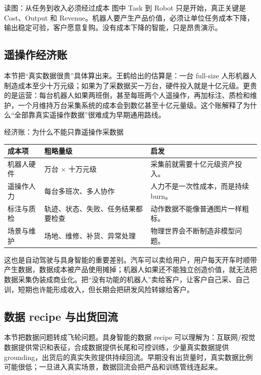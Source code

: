 \documentclass[a4paper]{article}
\begin{document}
\begin{knowledgebox}{读图：从任务到收入必须经过成本}
图中 Task 到 Robot 只是开始，真正关键是 Cost、Output 和 Revenue。机器人要产生产品价值，必须让单位任务成本下降，输出稳定可验，客户愿意复购。没有成本下降的智能，只是昂贵演示。
\end{knowledgebox}

\subsection{遥操作经济账}

本节把“真实数据很贵”具体算出来。王鹤给出的估算是：一台 full-size 人形机器人制造成本至少十万元级；如果为了采数据买一万台，硬件投入就是十亿元级。更贵的是运营：每台机器人如果两班倒，甚至每班两个人遥操作，再加标注、质检和维护，一个月维持万台采集系统的成本会到数亿甚至十亿元量级。这个账解释了为什么“全部靠真实遥操作数据”很难成为早期通用路线。

\begin{knowledgebox}{经济账：为什么不能只靠遥操作采数据}
\begin{tabularx}{\textwidth}{p{}p{}X}
\toprule
成本项 & 粗略量级 & 启发 \\
\midrule
机器人硬件 & 万台 $\times$ 十万元级 & 采集前就需要十亿元级资产投入。 \\
遥操作人力 & 每台多班次、多人协作 & 人力不是一次性成本，而是持续 burn。 \\
标注与质检 & 轨迹、状态、失败、任务结果都要检查 & 动作数据不能像普通图片一样粗标。 \\
场景与维护 & 场地、维修、补货、异常处理 & 物理世界会不断制造非模型问题。 \\
\bottomrule
\end{tabularx}
\end{knowledgebox}

这也是自动驾驶与具身智能的重要差别。汽车可以卖给用户，用户每天开车时顺带产生数据，数据成本被产品使用摊掉；机器人如果还不能独立创造价值，就无法把数据采集伪装成商业化。把“没有功能的机器人”卖给客户，让客户自己采、自己训，短期也许能形成收入，但长期会把研发风险转嫁给客户。

\subsection{数据 recipe 与出货回流}

本节把数据问题转成飞轮问题。具身智能的数据 recipe 可以理解为：互联网/视觉数据提供常识和表征，合成数据提供长尾和可控训练，少量真实数据提供 grounding，出货后的真实失败提供持续回流。早期没有出货量时，真实数据比例可能很低；一旦进入真实场景，数据回流会把产品和训练管线连起来。
\end{document}
